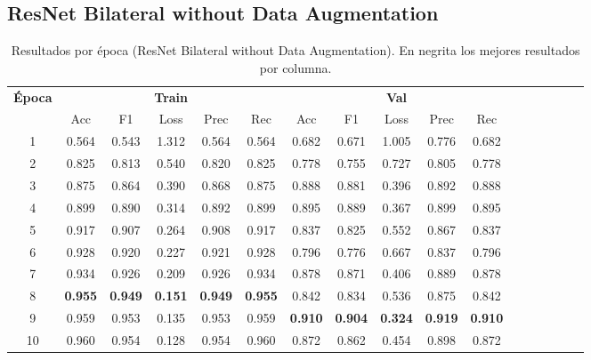 \documentclass[conference]{IEEEtran}
\begin{document}
\subsection{ResNet Bilateral without Data Augmentation}
\begin{table}[h]
\scriptsize
\caption{Resultados por época (ResNet Bilateral without Data Augmentation). En negrita los mejores resultados por columna.}
\centering
\begin{tabular}{|c|c|c|c|c|c|c|c|c|c|c|c|c|c|c|c|c|}
\hline
\textbf{Época} & \multicolumn{5}{c|}{\textbf{Train}} & \multicolumn{5}{c|}{\textbf{Val}} \\
\cline{2-11}
 & Acc & F1 & Loss & Prec & Rec & Acc & F1 & Loss & Prec & Rec \\
\hline
1 & 0.564 & 0.543 & 1.312 & 0.564 & 0.564 & 0.682 & 0.671 & 1.005 & 0.776 & 0.682 \\
2 & 0.825 & 0.813 & 0.540 & 0.820 & 0.825 & 0.778 & 0.755 & 0.727 & 0.805 & 0.778 \\
3 & 0.875 & 0.864 & 0.390 & 0.868 & 0.875 & 0.888 & 0.881 & 0.396 & 0.892 & 0.888 \\
4 & 0.899 & 0.890 & 0.314 & 0.892 & 0.899 & 0.895 & 0.889 & 0.367 & 0.899 & 0.895 \\
5 & 0.917 & 0.907 & 0.264 & 0.908 & 0.917 & 0.837 & 0.825 & 0.552 & 0.867 & 0.837 \\
6 & 0.928 & 0.920 & 0.227 & 0.921 & 0.928 & 0.796 & 0.776 & 0.667 & 0.837 & 0.796 \\
7 & 0.934 & 0.926 & 0.209 & 0.926 & 0.934 & 0.878 & 0.871 & 0.406 & 0.889 & 0.878 \\
8 & \textbf{0.955} & \textbf{0.949} & \textbf{0.151} & \textbf{0.949} & \textbf{0.955} & 0.842 & 0.834 & 0.536 & 0.875 & 0.842 \\
9 & 0.959 & 0.953 & 0.135 & 0.953 & 0.959 & \textbf{0.910} & \textbf{0.904} & \textbf{0.324} & \textbf{0.919} & \textbf{0.910} \\
10 & 0.960 & 0.954 & 0.128 & 0.954 & 0.960 & 0.872 & 0.862 & 0.454 & 0.898 & 0.872 \\
\hline
\end{tabular}
\label{tab:resnet_bilateral_noaug}
\end{table}
\end{document}
